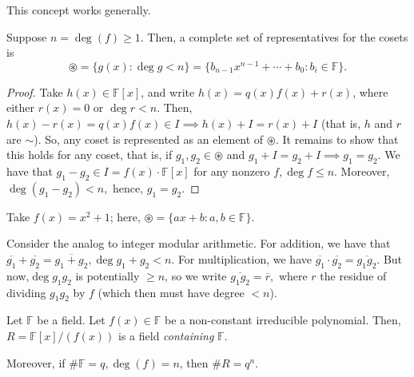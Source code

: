\documentclass[12pt,oneside]{article}
\begin{document}
\begin{remark}
  This concept works generally. %
\end{remark}

\begin{lemma}\label{lemma:completesetofreppoly}
  Suppose $n = \deg (f)\geq 1$. Then, a complete set of representatives for the cosets is \[\circledast = \{g(x) : \deg g < n\} = \{ b_{n-1} x^{n-1} + \cdots + b_0 : b_i \in \mathbb{F}\}.\]
\end{lemma}

\begin{proof}
  Take $h(x) \in \mathbb{F}[x]$, and write $h(x) = q(x)f(x) + r(x)$, where either $r(x) = 0$ or $\deg r < n$. Then, $h(x) -r(x) = q(x)f(x) \in I \implies h(x) + I = r(x) + I$ (that is, $h$ and $r$ are $\sim$). So, any coset is represented as an element of $\circledast$. It remains to show that this holds for any coset, that is, if $g_1, g_2 \in \circledast$ and $g_1 + I = g_2 + I \implies g_1 = g_2$. We have that $g_1 - g_2 \in I = f(x) \cdot \mathbb{F}[x]$ for any nonzero $f, \deg f \leq n$. Moreover, $\deg (g_1 - g_2) < n,$ hence, $g_1 = g_2$.
\end{proof}

\begin{example}
  Take $f(x) = x^2 + 1$; here, $\circledast =\{a x + b : a,b \in \mathbb{F}\}$.
\end{example}

\begin{remark}
  Consider the analog to integer modular arithmetic. For addition, we have that $\overline{g_1} + \overline{g_2} = \overline{g_1 + g_2}, \deg{g_1 + g_2} < n$. For multiplication, we have $\overline{g_1}\cdot\overline{g_2} = \overline{g_1g_2}$. But now,$\deg{g_1 g_2}$ is potentially $\geq n$, so we write $\overline{g_1 g_2} = \overline{r},$ where $r$ the residue of dividing $g_1 g_2$ by $f$ (which then must have degree $<n$).
\end{remark}

\begin{theorem}\label{thm:fieldcontstructionpoly}
  Let $\mathbb{F}$ be a field. Let $f(x) \in \mathbb{F}$ be a non-constant irreducible polynomial. Then, $R = \mathbb{F}[x]/(f(x))$ is a field \emph{containing} $\mathbb{F}$. 
  
  Moreover, if $\# \mathbb{F} = q, \deg(f) = n$, then $\# R = q^n$.
\end{theorem}
\end{document}
